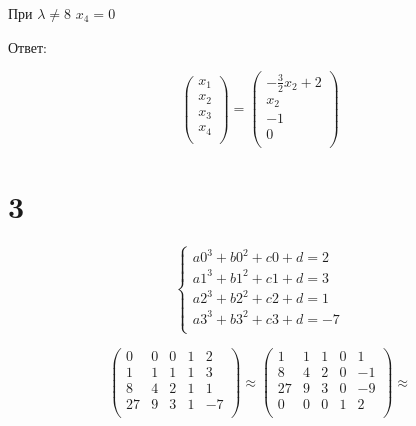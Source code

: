 \documentclass[a4paper]{article}
\begin{document}
При $\lambda \neq 8$ $x_4 = 0$

Ответ:

\begin{equation*}
\begin{pmatrix}
  x_1 \\
  x_2\\
  x_3\\
  x_4\\
\end{pmatrix} = 
\begin{pmatrix}
  -\frac{3}{2}x_2 + 2\\
x_2\\
	-1\\
	0\\
\end{pmatrix}
\end{equation*}

\section*{3}


\begin{equation*}
 \begin{cases}
  a0^3 + b0^2 + c0 + d = 2\\
  a1^3 + b1^2 + c1 + d = 3\\
  a2^3 + b2^2 + c2 + d = 1\\
  a3^3 + b3^2 + c3 + d = -7\\
 \end{cases}
\end{equation*}


\begin{equation*}
   \left(\begin{array}{rrrr|r}
   0 & 0 & 0 & 1 & 2\\ 
   1 & 1 & 1 & 1 & 3\\
   8 & 4 & 2 & 1 & 1\\ 
   27 & 9 & 3 & 1 & -7\\ 
   \end{array}\right)
\approx
  \left(\begin{array}{rrrr|r}
   1 & 1 & 1 & 0 & 1\\
   8 & 4 & 2 & 0 & -1\\ 
   27 & 9 & 3 &0 & -9\\ 
    0 & 0 & 0 & 1 & 2\\ 
   \end{array}\right)
  \approx
\end{equation*}
\end{document}
